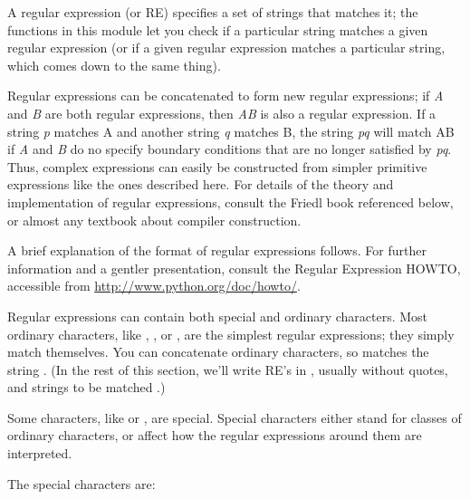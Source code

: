 A regular expression (or RE) specifies a set of strings that matches
it; the functions in this module let you check if a particular string
matches a given regular expression (or if a given regular expression
matches a particular string, which comes down to the same thing).

Regular expressions can be concatenated to form new regular
expressions; if \emph{A} and \emph{B} are both regular expressions,
then \emph{AB} is also a regular expression.  If a string \emph{p}
matches A and another string \emph{q} matches B, the string \emph{pq}
will match AB if \emph{A} and \emph{B} do no specify boundary
conditions that are no longer satisfied by \emph{pq}.  Thus, complex
expressions can easily be constructed from simpler primitive
expressions like the ones described here.  For details of the theory
and implementation of regular expressions, consult the Friedl book
referenced below, or almost any textbook about compiler construction.

A brief explanation of the format of regular expressions follows.  For
further information and a gentler presentation, consult the Regular
Expression HOWTO, accessible from \url{http://www.python.org/doc/howto/}.

Regular expressions can contain both special and ordinary characters.
Most ordinary characters, like , , or
, are the simplest regular expressions; they simply match
themselves.  You can concatenate ordinary characters, so 
matches the string .  (In the rest of this section, we'll
write RE's in , usually without quotes, and
strings to be matched .)

Some characters, like \character{|} or \character{(}, are special.
Special characters either stand for classes of ordinary characters, or
affect how the regular expressions around them are interpreted.

The special characters are:

